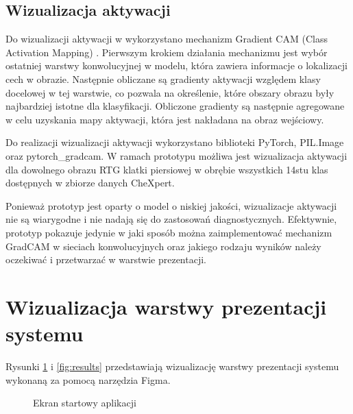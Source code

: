 \documentclass{article}
\begin{document}
\subsection{Wizualizacja aktywacji}

Do wizualizacji aktywacji w wykorzystano mechanizm Gradient CAM (Class Activation Mapping) \cite{selvaraju2017gradcam}.
Pierwszym krokiem działania mechanizmu jest wybór ostatniej warstwy konwolucyjnej w modelu, która zawiera informacje o lokalizacji cech w obrazie.
Następnie obliczane są gradienty aktywacji względem klasy docelowej w tej warstwie, co pozwala na określenie, które obszary obrazu były najbardziej istotne dla klasyfikacji.
Obliczone gradienty są następnie agregowane w celu uzyskania mapy aktywacji, która jest nakładana na obraz wejściowy.

Do realizacji wizualizacji aktywacji wykorzystano biblioteki PyTorch, PIL.Image oraz pytorch\_gradcam.
W ramach prototypu możliwa jest wizualizacja aktywacji dla dowolnego obrazu RTG klatki piersiowej w obrębie wszystkich 14stu klas dostępnych w zbiorze danych CheXpert.

Ponieważ prototyp jest oparty o model o niskiej jakości, wizualizacje aktywacji nie są wiarygodne i nie nadają się do zastosowań diagnostycznych.
Efektywnie, prototyp pokazuje jedynie w jaki sposób można zaimplementować mechanizm GradCAM w sieciach konwolucyjnych oraz jakiego rodzaju wyników należy oczekiwać i przetwarzać w warstwie prezentacji.

\section{Wizualizacja warstwy prezentacji systemu}
Rysunki \ref{fig:start} i \ref{fig:results} przedstawiają wizualizację warstwy prezentacji systemu wykonaną za pomocą narzędzia Figma.

\begin{figure}[H]
  \centering
  \caption{Ekran startowy aplikacji}
  \label{fig:start}
\end{figure}
\end{document}
